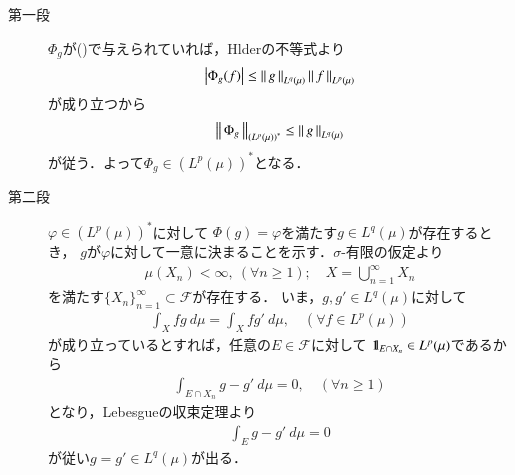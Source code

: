	\begin{prf}\mbox{}
		\begin{description}
			\item[第一段]
				$\Phi_g$が()で与えられていれば，Hlderの不等式より
				\begin{align}
					\left|\Phi_g(f)\right| \leq \left\|\, g\, \right\|_{L^q(\mu)}\left\|\, f\, \right\|_{L^p(\mu)}
				\end{align}
				が成り立つから
				\begin{align}
					\left\|\, \Phi_g\, \right\|_{\left( L^p(\mu) \right)^*} \leq \left\|\, g\, \right\|_{L^q(\mu)}
					\label{eq:thm_dual_space_of_L_p_3}
				\end{align}
				が従う．よって$\Phi_g \in \left( L^p(\mu) \right)^*$となる．
			
			\item[第二段]
				$\varphi \in \left( L^p(\mu) \right)^*$に対して
				$\Phi(g) = \varphi$を満たす$g \in L^q(\mu)$が存在するとき，
				$g$が$\varphi$に対して一意に決まることを示す．$\sigma$-有限の仮定より
				\begin{align}
					\mu(X_n) < \infty,\ (\forall n \geq 1);
					\quad X = \bigcup_{n=1}^\infty X_n
					\label{eq:thm_dual_space_of_L_p_6}
				\end{align}
				を満たす$\{X_n\}_{n=1}^\infty \subset \mathscr{F}$が存在する．
				いま，$g,g' \in L^q(\mu)$に対して
				\begin{align}
					\int_X fg\ d\mu = \int_X fg'\ d\mu,
					\quad (\forall f \in L^p(\mu))
				\end{align}
				が成り立っているとすれば，任意の$E \in \mathscr{F}$に対して
				$\mbox{1}\hspace{-0.25em}\mbox{l}_{E \cap X_n} \in L^p(\mu)$であるから
				\begin{align}
					\int_{E \cap X_n} g-g'\ d\mu = 0,
					\quad (\forall n \geq 1)
				\end{align}
				となり，Lebesgueの収束定理より
				\begin{align}
					\int_E g-g'\ d\mu = 0
				\end{align}
				が従い$g = g' \in L^q(\mu)$が出る．
				

\end{description}
\end{prf}
